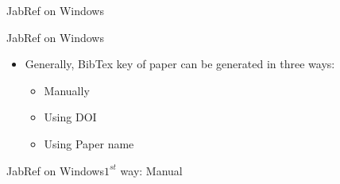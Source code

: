 \documentclass [9pt] {beamer}
\begin{document}
\begin{frame}{JabRef on Windows}%

\begin{figure}
\end{figure}

\end{frame}

\begin{frame}{JabRef on Windows}%
\begin{itemize}
\item Generally, BibTex key of paper can be generated in three ways:
\begin{itemize}
\item Manually
\item Using DOI
\item Using Paper name
\end{itemize}
\end{itemize}


\end{frame}


\begin{frame}{JabRef on Windows}{$1^{st}$ way: Manual}

\begin{figure}
	
\caption{}
\end{figure}

\end{frame}
\end{document}
